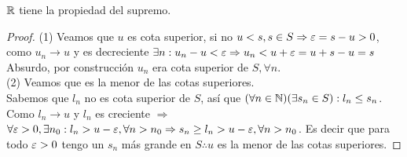 \begin{theorem}
  \(\mathbb{R} \) tiene la propiedad del supremo.
  \begin{proof}
    (1) Veamos que \(u\) es cota superior, si no \(u < s, s \in S \Rightarrow \varepsilon = s - u > 0\), como \(u_n \to u\) y es decreciente \(\exists n : u_n - u < \varepsilon \Rightarrow u_n < u + \varepsilon = u + s - u = s\) Absurdo, por construcción \(u_n\) era cota superior de \(S, \forall n\). \\

    (2) Veamos que es la menor de las cotas superiores. \\
    Sabemos que \(l_n\) no es cota superior de \(S\), así que \((\forall n \in \mathbb{N})(\exists s_n \in S) : l_n \leq s_n\). Como \(l_n \to u\) y \(l_n\) es creciente \(\Rightarrow \) \\
    \(\forall \varepsilon > 0, \exists n_0 : l_n > u - \varepsilon, \forall n>n_0 \Rightarrow s_n \geq l_n > u - \varepsilon, \forall n > n_0\). Es decir que para todo \(\varepsilon > 0\) tengo un \(s_n\) más grande en \(S \therefore u\) es la menor de las cotas superiores.
  \end{proof}
\end{theorem}

